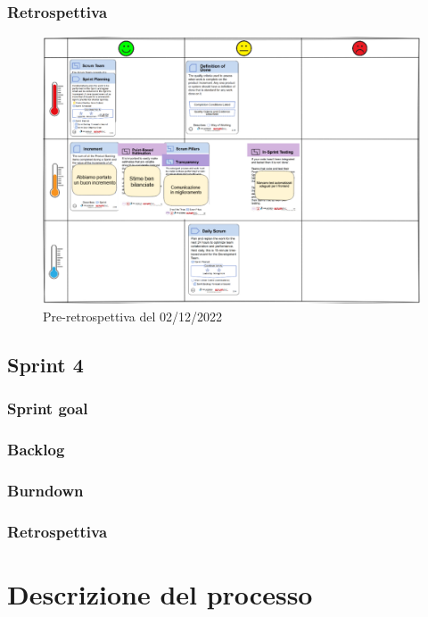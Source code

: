 \documentclass[11pt]{article}
\begin{document}
\subsubsection{Retrospettiva}
\begin{figure}[H]
    \centering
    \includegraphics[width=15cm]{./img/sprint3/retrospettiva.png}
    \caption{Pre-retrospettiva del 02/12/2022}
\end{figure}


\subsection{Sprint 4}
\subsubsection{Sprint goal}
\subsubsection{Backlog}
\subsubsection{Burndown}
\subsubsection{Retrospettiva}


\newpage
\section{Descrizione del processo}
\end{document}
